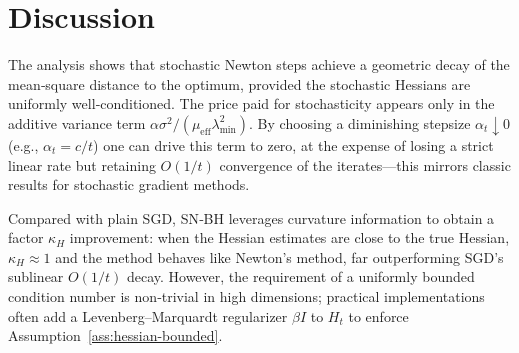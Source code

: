 \documentclass{article}
\begin{document}
\section*{Discussion}
The analysis shows that stochastic Newton steps achieve a geometric decay of the mean‑square distance to the optimum, provided the stochastic Hessians are uniformly well‑conditioned. The price paid for stochasticity appears only in the additive variance term $\alpha\sigma^2/(\mu_{\mathrm{eff}}\lambda_{\min}^2)$. By choosing a diminishing stepsize $\alpha_t\downarrow0$ (e.g., $\alpha_t=c/t$) one can drive this term to zero, at the expense of losing a strict linear rate but retaining $O(1/t)$ convergence of the iterates—this mirrors classic results for stochastic gradient methods.

Compared with plain SGD, SN‑BH leverages curvature information to obtain a factor $\kappa_H$ improvement: when the Hessian estimates are close to the true Hessian, $\kappa_H\approx1$ and the method behaves like Newton’s method, far outperforming SGD’s sublinear $O(1/t)$ decay. However, the requirement of a uniformly bounded condition number is non‑trivial in high dimensions; practical implementations often add a Levenberg–Marquardt regularizer $\beta I$ to $H_t$ to enforce Assumption~\ref{ass:hessian-bounded}.

\end{document}
